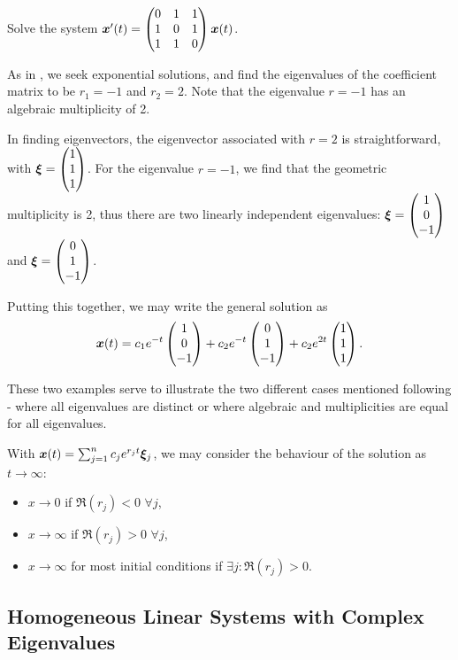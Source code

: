 \begin{eg}
	Solve the system $\bm{x}'(t) = \begin{pmatrix}0 & 1 & 1 \\ 1 & 0 & 1 \\ 1 & 1 & 0\end{pmatrix} \bm{x}(t)$.
	
	As in , we seek exponential solutions, and find the eigenvalues of the coefficient matrix to be $r_1 = -1$ and $r_2 = 2$. Note that the eigenvalue $r=-1$ has an algebraic multiplicity of 2.
	
	In finding eigenvectors, the eigenvector associated with $r=2$ is straightforward, with $\bm{\xi} = \begin{pmatrix}1 \\ 1 \\ 1\end{pmatrix}$. For the eigenvalue $r=-1$, we find that the geometric multiplicity is 2, thus there are two linearly independent eigenvalues: $\bm{\xi} = \begin{pmatrix}1 \\ 0 \\ -1\end{pmatrix}$ and $\bm{\xi} = \begin{pmatrix}0 \\ 1 \\ -1\end{pmatrix}$.
	
	Putting this together, we may write the general solution as 
	\[
	\bm{x}(t) = c_1 e^{-t}\begin{pmatrix}1 \\ 0 \\ -1\end{pmatrix} + c_2 e^{-t} \begin{pmatrix}0 \\ 1 \\ -1\end{pmatrix} + c_2 e^{2t}\begin{pmatrix}1 \\ 1 \\ 1\end{pmatrix}.
	\]
\end{eg}

These two examples serve to illustrate the two different cases mentioned following  - where all eigenvalues are distinct or where algebraic and multiplicities are equal for all eigenvalues.

\begin{remark}
	With $\bm{x}(t) = \sum_{j=1}^n c_j e^{r_jt} \bm{\xi}_j$, we may consider the behaviour of the solution as $t \to \infty$:
	\begin{itemize}
		\item $x \to 0$ if $\Re(r_j) < 0 \,\, \forall j$,
		\item $x \to \infty$ if $\Re(r_j) > 0 \,\, \forall j$,
		\item $x \to \infty$ for most initial conditions if $\exists j: \Re(r_j) > 0$.
	\end{itemize}
\end{remark}

\subsection{Homogeneous Linear Systems with Complex Eigenvalues}\label{sec:complexeigs}

